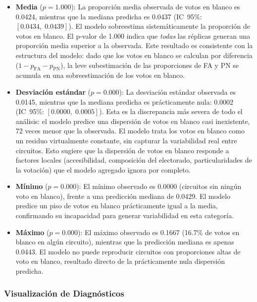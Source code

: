\begin{itemize}
    \item \textbf{Media} ($p = 1.000$): La proporci\'on media observada de votos en blanco es 0.0424, mientras que la mediana predicha es 0.0437 (IC~95\%: $[0.0434,\; 0.0439]$). El modelo sobreestima sistem\'aticamente la proporci\'on de votos en blanco. El p-valor de 1.000 indica que \emph{todas} las r\'eplicas generan una proporci\'on media superior a la observada. Este resultado es consistente con la estructura del modelo: dado que los votos en blanco se calculan por diferencia ($1 - p_{\text{FA}} - p_{\text{PN}}$), la leve subestimaci\'on de las proporciones de FA y PN se acumula en una sobreestimaci\'on de los votos en blanco.

    \item \textbf{Desviaci\'on est\'andar} ($p = 0.000$): La desviaci\'on est\'andar observada es 0.0145, mientras que la mediana predicha es pr\'acticamente nula: 0.0002 (IC~95\%: $[0.0000,\; 0.0005]$). Esta es la discrepancia m\'as severa de todo el an\'alisis: el modelo predice una dispersi\'on de votos en blanco casi inexistente, 72 veces menor que la observada. El modelo trata los votos en blanco como un residuo virtualmente constante, sin capturar la variabilidad real entre circuitos. Esto sugiere que la dispersi\'on de votos en blanco responde a factores locales (accesibilidad, composici\'on del electorado, particularidades de la votaci\'on) que el modelo agregado ignora por completo.

    \item \textbf{M\'inimo} ($p = 0.000$): El m\'inimo observado es 0.0000 (circuitos sin ning\'un voto en blanco), frente a una predicci\'on mediana de 0.0429. El modelo predice un piso de votos en blanco pr\'acticamente igual a la media, confirmando su incapacidad para generar variabilidad en esta categor\'ia.

    \item \textbf{M\'aximo} ($p = 0.000$): El m\'aximo observado es 0.1667 (16.7\% de votos en blanco en alg\'un circuito), mientras que la predicci\'on mediana es apenas 0.0443. El modelo no puede reproducir circuitos con proporciones altas de voto en blanco, resultado directo de la pr\'acticamente nula dispersi\'on predicha.
\end{itemize}

\subsubsection{Visualizaci\'on de Diagn\'osticos}

